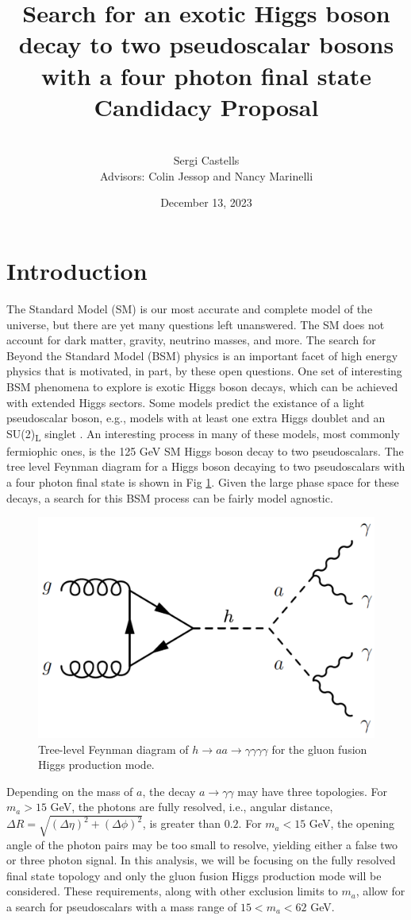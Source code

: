 \documentclass[12pt]{article}
\title{
    Search for an exotic Higgs boson decay to two pseudoscalar bosons with a four photon final state\\[0.2cm]
    \Large Candidacy Proposal
}
\author{\\[0.25cm]Sergi Castells\\[0.25cm] Advisors: Colin Jessop and Nancy Marinelli\\[0.75cm]}
\date{December 13, 2023}
\begin{document}
\maketitle

\section{Introduction}
The Standard Model (SM) is our most accurate and complete model of the universe, but there are yet many questions left unanswered. The SM does not account for dark matter, gravity, neutrino masses, and more. The search for Beyond the Standard Model (BSM) physics is an important facet of high energy physics that is motivated, in part, by these open questions. One set of interesting BSM phenomena to explore is exotic Higgs boson decays, which can be achieved with extended Higgs sectors. Some models predict the existance of a light pseudoscalar boson, e.g., models with at least one extra Higgs doublet and an SU(2)\textsubscript{L} singlet \cite{Curtin_2014}. An interesting process in many of these models, most commonly fermiophic ones, is the 125 GeV SM Higgs boson decay to two pseudoscalars. The tree level Feynman diagram for a Higgs boson decaying to two pseudoscalars with a four photon final state is shown in Fig \ref{fig:h4g-feynman-diag}. Given the large phase space for these decays, a search for this BSM process can be fairly model agnostic.\par

\begin{figure}
    \centering
    \includegraphics[width=0.45\linewidth]{figures/h4g-feynman-diagram.png}
    \caption{Tree-level Feynman diagram of $h\rightarrow aa \rightarrow \gamma\gamma\gamma\gamma$ for the gluon fusion Higgs production mode.}
    \label{fig:h4g-feynman-diag}
\end{figure}

Depending on the mass of $a$, the decay $a\rightarrow \gamma\gamma$ may have three topologies. For $m_{a} > 15$ GeV, the photons are fully resolved, i.e., angular distance, $\Delta R = \sqrt{(\Delta \eta)^2 + (\Delta \phi)^2}$, is greater than $0.2$. For $m_{a} < 15$ GeV, the opening angle of the photon pairs may be too small to resolve, yielding either a false two or three photon signal. In this analysis, we will be focusing on the fully resolved final state topology and only the gluon fusion Higgs production mode will be considered. These requirements, along with other exclusion limits to $m_{a}$, allow for a search for pseudoscalars with a mass range of $15 < m_{a} < 62$ GeV.\par
\end{document}
